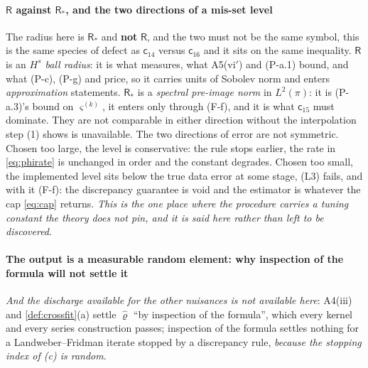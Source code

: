 \paragraph{$\mathsf R$ against $\mathsf R_\ast$, and the two directions of a mis-set level}

The radius here is $\mathsf R_\ast$ and \textbf{not} $\mathsf R$, and the two must not be the same
symbol, this is the same species of defect as $\mathsf c_{14}$ versus $\mathsf c_{16}$ and it sits on
the same inequality. $\mathsf R$ is an \emph{$H^{s}$ ball radius}: it is what 
measures, what A5(vi$'$) and (P-a.1) bound, and what (P-c), (P-g) and  price, so it
carries units of Sobolev norm and enters \emph{approximation} statements. $\mathsf R_\ast$ is a
\emph{spectral pre-image norm} in $L^{2}(\pi)$: it is (P-a.3)'s bound on $\varsigma^{(k)}$, it enters
only through (F-f), and it is what $\mathsf c_{15}$ must dominate. They are not comparable in
either direction without the interpolation step \textup{(1)} shows is unavailable.
The two directions of error are not symmetric. Chosen too large, the level is
conservative: the rule stops earlier, the rate in \eqref{eq:phirate} is unchanged in order and the
constant degrades. Chosen too small, the implemented level sits below the true data error
at some stage, (L3) fails, and with it (F-f): the discrepancy guarantee is void and the estimator is
whatever the cap \eqref{eq:cap} returns. \emph{This is the one place where the procedure carries a tuning constant the
theory does not pin, and it is said here rather than left to be discovered}.

\paragraph{The output is a measurable random element: why inspection of the formula will not settle it}

\emph{And the discharge
available for the other nuisances is not available here}: A4(iii) and \cref{def:crossfit}\textup{(a)} settle
$\hat\varrho$ ``by inspection of the formula'', which every kernel and every series construction passes;
inspection of the formula settles nothing for a Landweber--Fridman iterate stopped by a discrepancy rule,
\emph{because the stopping index of \textup{(c)} is random}.

